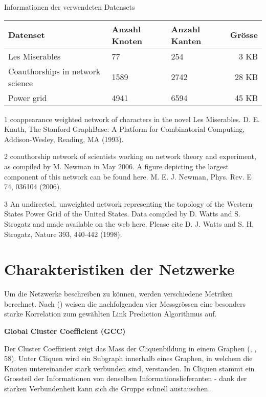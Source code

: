 \begin{threeparttable}
    \centering
    \label{dataset_info}
    \caption{Informationen der verwendeten Datensets}
    \begin{tabular}{@{}lllr@{}}
        \toprule
        Datenset                        & Anzahl Knoten & Anzahl Kanten & Grösse \\ \midrule
        Les Miserables\tnote{1}                 & 77     & 254 & 3 KB   \\
        Coauthorships in network science\tnote{2} & 1589    & 2742 & 28 KB     \\
        Power grid\tnote{3}                       & 4941   & 6594 & 45 KB   \\ \bottomrule
    \end{tabular}
    \begin{tablenotes}[\flushleft]
        \footnotesize
        \item[1] coappearance weighted network of characters in the novel Les Miserables. D. E. Knuth, The Stanford GraphBase: A Platform for Combinatorial Computing, Addison-Wesley, Reading, MA (1993).
        \item[2] coauthorship network of scientists working on network theory and experiment, as compiled by M. Newman in May 2006. A figure depicting the largest component of this network can be found here. M. E. J. Newman, Phys. Rev. E 74, 036104 (2006).
        \item[3] An undirected, unweighted network representing the topology of the Western States Power Grid of the United States. Data compiled by D. Watts and S. Strogatz and made available on the web here. Please cite D. J. Watts and S. H. Strogatz, Nature 393, 440-442 (1998).
    \end{tablenotes}
\end{threeparttable}

\section{Charakteristiken der Netzwerke}
Um die Netzwerke beschreiben zu können, werden verschiedene Metriken berechnet.
Nach \citeauthor{gao_link_2015} (\citeyear{gao_link_2015}) weisen die nachfolgenden vier Messgrössen eine besonders starke Korrelation zum gewählten Link Prediction Algorithmus auf.

\textbf{Global Cluster Coefficient (GCC)}

Der Cluster Coeffizient zeigt das Mass der Cliquenbildung in einem Graphen (\citeauthor{michael_henninger_soziale_2018}, \citeyear{michael_henninger_soziale_2018}, 58).
Unter Cliquen wird ein Subgraph innerhalb eines Graphen, in welchem die Knoten untereinander stark verbunden sind, verstanden.
In Cliquen stammt ein Grossteil der Informationen von denselben Informationslieferanten - dank der starken Verbundenheit kann sich die Gruppe schnell austauschen.


